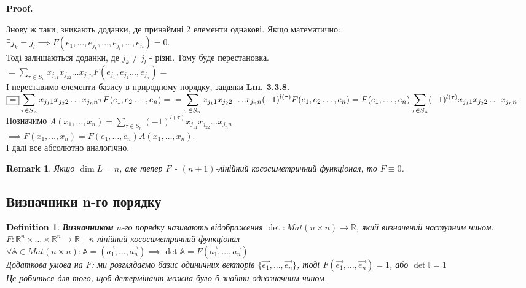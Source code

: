 \documentclass[a4paper, 10pt]{article}
\makeatletter
\def\huge{\displaystyle}
\def\qed{$\blacksquare$}
\theoremstyle{theoremdd}
\theoremstyle{theoremdd}
\newtheorem{definition}[theorem]{Definition}
\theoremstyle{theoremdd}
\theoremstyle{theoremdd}
\theoremstyle{theoremdd}
\theoremstyle{theoremdd}
\newtheorem{remark}[theorem]{Remark}
\theoremstyle{theoremdd}
\theoremstyle{theoremdd}
\renewenvironment{proof}[1][Proof.\\]{\par
\pushQED{\hfill \qed}%
\normalfont \topsep6\p@\@plus6\p@\relax
\trivlist
\item\relax
{\bfseries
#1\@addpunct{.}}\hspace\labelsep\ignorespaces
}{%
\popQED\endtrivlist\@endpefalse
}
\makeatother
\begin{document}
\begin{proof}
Знову ж таки, зникають доданки, де принаймні 2 елементи однакові. Якщо математично:\\
$\exists j_k = j_l \implies F(e_1,\dots, e_{j_k}, \dots, e_{j_l}, \dots, e_n) = 0$.\\
Тоді залишаються доданки, де $j_k \neq j_l$ - різні. Тому буде перестановка.\\
$\huge \boxed{=} \sum_{\tau \in S_n} x_{j_11}x_{j_22}\dots x_{j_nn} F(e_{j_1},e_{j_2}\dots, e_{j_n}) \boxed{=}$\\
І переставимо елементи базису в природному порядку, завдяки \textbf{Lm. 3.3.8.} \\
$\huge \boxed{=} \sum_{\tau \in S_n} x_{j_11}x_{j_22}\dots x_{j_nn} \tau F(e_1,e_2\dots, e_n) = \\
= \huge \sum_{\tau \in S_n} x_{j_11}x_{j_22}\dots x_{j_nn} (-1)^{l(\tau)} F(e_1,e_2\dots, e_n) = \huge F(e_1,\dots,e_n) \sum_{\tau \in S_n} (-1)^{l(\tau)} x_{j_11}x_{j_22}\dots x_{j_nn}$.\\
Позначимо $A(x_1,\dots,x_n) = \huge \sum_{\tau \in S_n} (-1)^{l(\tau)} x_{j_11}x_{j_22}\dots x_{j_nn}$\\
$\implies F(x_1,\dots,x_n) = F(e_1,\dots,e_n)A(x_1,\dots,x_n)$.\\
І далі все абсолютно аналогічно.
\end{proof}

\begin{remark}
Якщо $\dim L = n$, але тепер $F$ - $(n+1)$-лінійний кососиметричний функціонал, то $F \equiv 0$.
\end{remark}

\subsection{Визначники n-го порядку}
\begin{definition}
\textbf{Визначником} $n$-го порядку називають відображення $\det : Mat(n \times n) \to \mathbb{R}$, який визначений наступним чином:\\
$F: \mathbb{R}^n \times \dots \times \mathbb{R}^n \to \mathbb{R}$ - $n$-лінійний кососиметричний функціонал\\
$\forall \mathbb{A} \in Mat(n \times n): \mathbb{A} = (\vec{a_1},\dots, \vec{a_n}) \implies \det \mathbb{A} = F(\vec{a_1},\dots,\vec{a_n})$\\
Додаткова умова на $F$: ми розглядаємо базис одиничних векторів $\{\vec{e_1},\dots, \vec{e_n}\}$, тоді $F(\vec{e_1},\dots,\vec{e_n}) = 1$, або $\det \mathbb{I} = 1$\\
\textit{Це робиться для того, щоб детермінант можна було б знайти однозначним чином.}
\end{definition}
\end{document}
